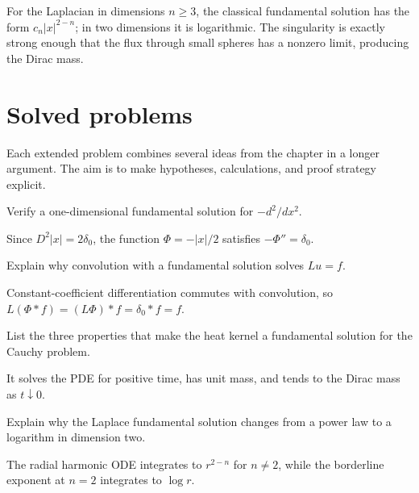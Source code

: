\begin{example}\label{ex:iii24-worked-04}
For the Laplacian in dimensions \(n\ge3\), the classical fundamental
solution has the form \(c_n|x|^{2-n}\); in two dimensions it is logarithmic.
The singularity is exactly strong enough that the flux through small spheres
has a nonzero limit, producing the Dirac mass.
\end{example}

\section{Solved problems}
Each extended problem combines several ideas from the chapter in a longer argument. The aim is to make hypotheses, calculations, and proof strategy explicit.

\begin{problem}\label{prob:iii24-problem-01}
Verify a one-dimensional fundamental solution for \(-d^2/dx^2\).
\end{problem}
\begin{solution}
Since \(D^2|x|=2\delta_0\), the function
\(\Phi=-|x|/2\) satisfies \(-\Phi''=\delta_0\).
\end{solution}

\begin{problem}\label{prob:iii24-problem-02}
Explain why convolution with a fundamental solution solves \(Lu=f\).
\end{problem}
\begin{solution}
Constant-coefficient differentiation commutes with convolution, so
\(L(\Phi*f)=(L\Phi)*f=\delta_0*f=f\).
\end{solution}

\begin{problem}\label{prob:iii24-problem-03}
List the three properties that make the heat kernel a fundamental solution for the Cauchy problem.
\end{problem}
\begin{solution}
It solves the PDE for positive time, has unit mass, and tends to the Dirac
mass as \(t\downarrow0\).
\end{solution}

\begin{problem}\label{prob:iii24-problem-04}
Explain why the Laplace fundamental solution changes from a power law to a logarithm in dimension two.
\end{problem}
\begin{solution}
The radial harmonic ODE integrates to \(r^{2-n}\) for \(n\ne2\), while the
borderline exponent at \(n=2\) integrates to \(\log r\).
\end{solution}

